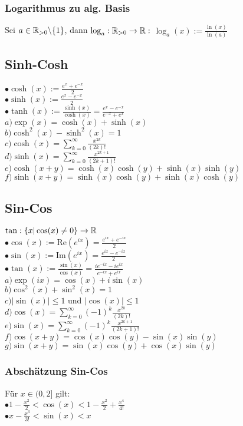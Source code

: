 \subsubsection*{Logarithmus zu alg. Basis}
Sei $a \in \mathbb R_{> 0}\backslash\{1\}$, dann $\log_a: \mathbb R_{> 0} \rightarrow \mathbb R:$ $\log_a(x) := \frac{\ln(x)}{\ln(a)}$
\subsection*{Sinh-Cosh}
$\bullet \cosh(x) := \frac{e^x + e^{-x}}{2}$\\
$\bullet \sinh(x) := \frac{e^x - e^{-x}}{2}$\\
$\bullet \tanh(x) := \frac{\sinh(x)}{\cosh(x)} = \frac{e^x - e^{-x}}{e^{-x}  + e^x}$\\
$a) \exp(x) = \cosh(x) + \sinh(x)$\\
$b) \cosh^2(x) - \sinh^2(x) = 1$\\
$c) \cosh(x) = \sum_{k = 0}^{\infty} \frac{x^{2k}}{(2k)!}$\\
$d) \sinh(x) = \sum_{k = 0}^{\infty} \frac{x^{2k+1}}{(2k + 1)!}$\\
$e) \cosh(x + y) = \cosh(x)\cosh(y) + \sinh(x) \sinh(y)$\\
$f) \sinh(x + y) = \sinh(x) \cosh(y) + \sinh(x) \cosh(y)$
\subsection*{Sin-Cos}
$\tan: \{x| \cos(x) \neq 0\} \rightarrow \mathbb R$\\
$\bullet \cos(x) := \text{Re}(e^{ix}) = \frac{e^{ix} + e^{-ix}}{2}$\\
$\bullet \sin(x) := \text{Im}(e^{ix}) = \frac{e^{ix} - e^{-ix}}{2}$\\
$\bullet \tan(x) := \frac{\sin(x)}{\cos(x)} = \frac{ie^{-ix} - ie^{ix}}{e^{-ix} + e^{ix}}$\\
$a) \exp(ix) = \cos(x) + i \sin(x)$\\
$b) \cos^2(x) + \sin^2(x) = 1$\\
$c) |\sin(x)| \leq 1$ und $|\cos(x)| \leq 1$\\
$d) \cos(x) = \sum_{k = 0}^\infty (-1)^k \frac{x^{2k}}{(2k)!}$\\
$e) \sin(x) = \sum_{k = 0}^{\infty} (-1)^k \frac{x^{2k +1}}{(2k + 1)!}$\\
$f) \cos(x + y) = \cos(x) \cos(y) - \sin(x) \sin(y)$\\
$g) \sin(x + y) =  \sin(x) \cos(y) + \cos(x)\sin(y)$
\subsubsection*{Abschätzung Sin-Cos}
Für $x \in (0, 2]$ gilt:\\
    $\bullet 1 - \frac{x^2}{2} < \cos(x) < 1 - \frac{x^2}{2} + \frac{x^4}{4!}$\\
    $\bullet x - \frac{x^3}{3!} < \sin(x) < x$
